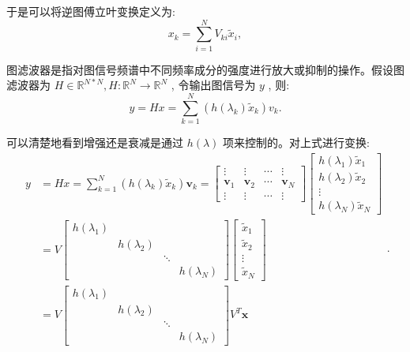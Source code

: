 于是可以将逆图傅立叶变换定义为:
\[
{x}_{k} = \sum\limits_{{i = 1}}^{N}{V}_{ki}{\tilde{x}}_{i}, 
\]

图滤波器是指对图信号频谱中不同频率成分的强度进行放大或抑制的操作。假设图滤波器为 \({H} \in  {\mathbb{R}}^{{N} * {N}}, {H} : \mathbb{R}^N \rightarrow  \mathbb{R}^N\) , 令输出图信号为 \({y}\) , 则:
\[
{y} = {{Hx}} = \sum\limits_{{{k} = 1}}^{{N}}\left( {{h}\left( {\lambda }_{k}\right) {\tilde{x}}_{{k}}}\right) v_{{k}}.
\]

可以清楚地看到增强还是衰减是通过 \({h}\left( \lambda \right)\) 项来控制的。对上式进行变换:
\[
\begin{aligned}
y & =H x=\sum_{k=1}^N\left(h\left(\lambda_k\right) \tilde{x}_k\right) \boldsymbol{v}_k=\left[\begin{array}{cccc}
\vdots & \vdots & \cdots & \vdots \\
\boldsymbol{v}_1 & \boldsymbol{v}_2 & \cdots & \boldsymbol{v}_N \\
\vdots & \vdots & \cdots & \vdots
\end{array}\right]\left[\begin{array}{c}
h\left(\lambda_1\right) \tilde{x}_1 \\
h\left(\lambda_2\right) \tilde{x}_2 \\
\vdots \\
h\left(\lambda_N\right) \tilde{x}_N
\end{array}\right] \\
& =V\left[\begin{array}{cccc}
h\left(\lambda_1\right) & & & \\
& h\left(\lambda_2\right) & & \\
& & \ddots & \\
& & & h\left(\lambda_N\right)
\end{array}\right]\left[\begin{array}{c}
\tilde{x}_1 \\
\tilde{x}_2 \\
\vdots \\
\tilde{x}_N
\end{array}\right] \\
& =V\left[\begin{array}{cccc}
h\left(\lambda_1\right) & & & \\
& h\left(\lambda_2\right) & & \\
& & \ddots & \\
& & & h\left(\lambda_N\right)
\end{array}\right] V^{T} \boldsymbol{x}
\end{aligned}.
\]

